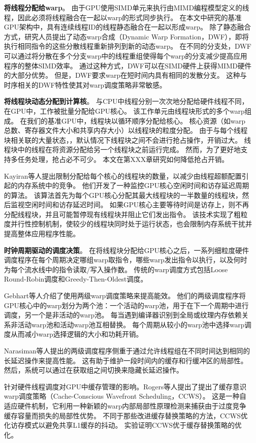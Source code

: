 \textbf{将线程分配给warp}。
由于GPU使用SIMD单元来执行由MIMD编程模型定义的线程，因此必须将线程融合在一起以warp的形式同步执行。 
在本文中研究的基准GPU架构中，具有连续线程ID的线程静态融合在一起以形成warp。 
除了静态融合方式，研究人员提出了动态warp合成（Dynamic Warp Formation，DWF），即将执行相同指令的这些分散线程重新排列到新的动态warp。 
在不同的分支处，DWF可以通过将分散在多个分支warp中的线程重组使得每个warp的分支减少提高应用程序的整体SIMD效率。 
通过这种方式，DWF可以在SIMD硬件上获得MIMD硬件的大部分优势。 
但是，DWF要求warp在短时间内具有相同的发散分支。 
这种与时序相关的DWF特性使其对warp调度策略非常敏感。

\textbf{将线程块动态分配到计算核}。
与CPU中线程分别一次次地分配给硬件线程不同，
在GPU中，工作被批量分配给GPU核心。 
该工作单元由线程块形式的多个warp组成。 
在我们的基准GPU中，线程块以循环顺序分配给核心。 
核心资源（如warp总数、寄存器文件大小和共享内存大小）以线程块的粒度分配。 
由于与每个线程块相关联的大量状态，，默认情况下线程块之间不会进行抢占操作，开销过大。
线程块中的线程在将资源分配给另一个线程块之前运行完成。
然而，为了更好地支持多任务处理，抢占必不可少。
本文在第XXX章研究如何降低抢占开销。

Kayiran等人提出限制分配给每个核心的线程块的数量，以减少由线程超额配置引起的内存系统中的竞争。 
他们开发了一种监控GPU核心空闲时间和访存延迟周期的算法。 
该算法首先为每个GPU核心分配其最大线程块的一半数量的线程块，然后监视空闲时间和访存延迟时间。 
如果GPU核心主要等待时间是访存上，则不再分配线程块，并且可能暂停现有线程块并阻止它们发出指令。 
该技术实现了粗粒度并行性控制机制，使较少的线程块同时处于运行状态，也会限制内存系统干扰并提高整体应用程序性能。


\textbf{时钟周期驱动的调度决策}。
在将线程块分配给GPU核心之后，一系列细粒度硬件调度程序在每个周期决定哪组warp取指令，哪些warp发出指令以执行，以及何时为每个流水线中的指令读取/写入操作数。
传统的warp调度方式包括Loose Round-Robin调度和Greedy-Then-Oldest调度。

Gebhart等人介绍了使用两级warp调度策略来提高能效。
他们的两级调度程序将GPU核心中的warp划分为两个池：一个活动的warp池，用于在下一个周期中进行调度，另一个是非活动的warp池。
每当遇到编译器识别到全局或纹理内存依赖关系非活动warp池和活动warp池互相替换。
每个周期从较小的warp池中选择warp调度从而减小warp选择逻辑的大小和功耗开销。 

Narasiman等人提出的两级调度程序侧重于通过允许线程组在不同时间达到相同的长延迟操作来提高性能。
这有助于维护一段时间内的缓存和行缓冲区的局部性。
然后，系统可以通过在获取组之间切换来隐藏长延迟操作。

针对硬件线程调度对GPU中缓存管理的影响。Rogers等人提出了提出了缓存意识warp调度策略（Cache-Conscious Wavefront Scheduling，CCWS）。
这是一种自适应硬件机制，它利用一种新颖的warp内部局部性原理检测来捕获由于过度竞争缓存容量而损失的局部性优势。
不同于那些改进缓存替换策略的方法，CCWS优化访存模式以避免共享L1缓存的抖动。
实验证明CCWS优于缓存替换策略的优化。

